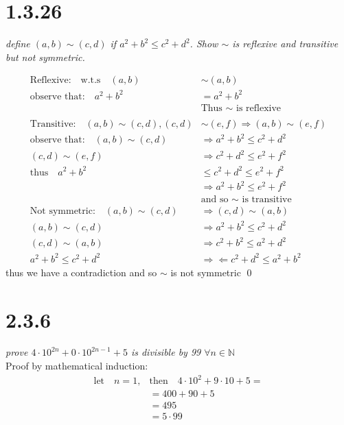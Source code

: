 \documentclass[a4paper, 11pt]{article}
\begin{document}
\section*{1.3.26}
\textit{define $(a,b) \sim (c,d)$ if $a^2 + b^2 \leq c^2 + d^2$. Show $\sim$ is reflexive and transitive but not symmetric.}

\begin{align*}
	\mbox{Reflexive:} \quad \mbox{w.t.s} \quad (a,b) &\sim (a,b) \\ 
	\mbox{observe that:} \quad a^2 + b^2 &= a^2 + b^2 \\
	&\mbox{Thus $\sim$ is reflexive} \\ \\ 
	\mbox{Transitive:} \quad (a,b) \sim (c,d), (c,d) &\sim (e,f)  \Rightarrow (a,b) \sim (e,f) \\ 
	\mbox{observe that:} \quad (a,b) \sim (c,d) &\Rightarrow a^2 + b^2 \leq c^2 + d^2 \\ 
	(c,d) \sim (e,f) &\Rightarrow c^2 + d^2 \leq e^2 + f^2 \\ 
	\mbox{thus} \quad a^2+b^2 &\leq c^2 + d^2 \leq e^2 + f^2 \\ 
	&\Rightarrow a^2 + b^2 \leq e^2 + f^2 \\ 
	&\mbox{and so $\sim$ is transitive} \\ 
	\mbox{Not symmetric:} \quad (a,b) \sim (c,d) &\Rightarrow (c,d) \sim (a,b) \\ 
	(a,b) \sim (c,d) &\Rightarrow a^2 + b^2 \leq c^2 + d^2 \\ 
	(c,d) \sim (a,b) &\Rightarrow c^2 + b^2 \leq a^2 + d^2 \\ 
	a^2 + b^2 \leq c^2 + d^2 &\Rightarrow \Leftarrow c^2 + d^2 \leq a^2 + b^2
\end{align*}
thus we have a contradiction and so $\sim$ is not symmetric \qed

\section*{2.3.6}
\textit{prove $4 \cdot 10^{2n} + 0 \cdot 10 ^{2n-1} +5$ is divisible by 99 $\forall n \in \mathbb{N}$} \\ 
Proof by mathematical induction: 
\begin{align*}
	\mbox{let} \quad n=1, & \mbox{then} \quad 4\cdot 10^2 + 9\cdot 10 + 5 = \\ 
	&= 400 + 90 + 5 \\ 
	&= 495  \\ 
	&= 5 \cdot 99
\end{align*}
\end{document}
